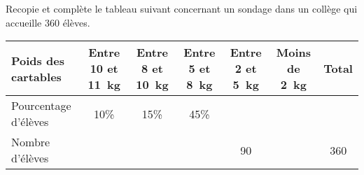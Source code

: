 Recopie et complète le tableau suivant concernant un sondage dans un collège qui accueille 360 élèves.
\begin{center}
  \begin{tabular}{|m{3cm}|c|c|c|c|c|c|}
    \hline
Poids des cartables&\multicolumn{1}{m{2cm}|}{Entre 10 et 11~kg}&\multicolumn{1}{m{2cm}|}{Entre 8 et 10~kg}&\multicolumn{1}{m{2cm}|}{Entre 5 et 8~kg}&\multicolumn{1}{m{2cm}|}{Entre 2 et 5~kg}&\multicolumn{1}{m{2cm}|}{Moins de 2~kg}&Total\\
\hline
Pourcentage d'élèves&10\%&15\%&45\%&&&\\
\hline
Nombre d'élèves&&&&90&&360\\
\hline
  \end{tabular}
\end{center}